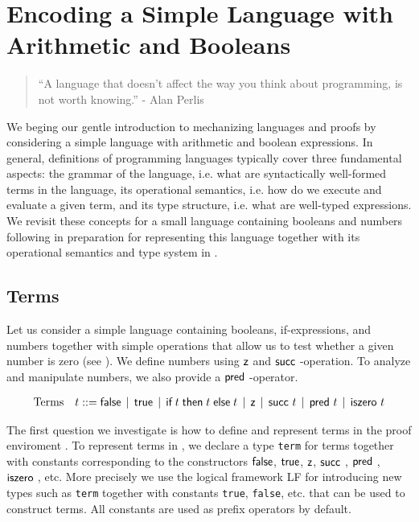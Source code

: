 

\chapter{Encoding a Simple Language with Arithmetic and Booleans}
\label{chap:basic}
\begin{quote}
``A language that doesn't affect the way you think about programming, is
not worth knowing.''
\hfill - Alan Perlis
\end{quote}

We beging our gentle introduction to mechanizing languages and proofs by
considering a simple language with arithmetic and boolean
expressions. In general, definitions of programming languages
typically cover three fundamental aspects: 
the grammar  of the language,  i.e. what are syntactically  well-formed terms in
the language,  its operational semantics,  i.e. how do we execute and evaluate a
given term,  and its  type structure, i.e. what are  well-typed expressions.  We
revisit  these concepts  for  a small language  containing booleans  and numbers
following \citep[Ch 3,Ch 8]{TAPL} in  preparation for representing this language
together with its operational semantics and type system in \beluga.

\section{Terms}\label{sec:terms-basic}
Let  us  consider  a simple language  containing booleans,  if-expressions,  and
numbers together  with simple operations  that allow us  to test whether a given
number is zero (see \cite[Ch 3, Fig 3-1,Fig 3-2]{TAPL}). We define numbers using
$\textsf{z}$ and $\tmsucc$-operation.  To analyze  and manipulate numbers,  we also
provide a $\tmpred$-operator.

\[
\begin{array}{ll@{\bnfas}l}
\mbox{Terms} & t & \tmfalse \bnfalt \tmtrue \bnfalt \tmif t t t \bnfalt
\tmzero \bnfalt \tmsucc t \bnfalt \tmpred t \bnfalt \tmiszero t
\end{array}
\]

The first question  we investigate is  how to define  and represent terms in the
proof  enviroment  \beluga. To represent  terms  in \beluga,  we declare  a type
\lstinline!term!  for  terms   together  with  constants  corresponding  to  the
constructors    $\textsf{false}$,   $\textsf{true}$,    $\textsf{z}$,   $\tmsucc$,   $\tmpred$,
$\tmiszero$,  etc.   More   precisely   we   use   the   logical   framework  LF
\citep{Harper93jacm} for introducing new types such as \lstinline!term! together
with constants  \lstinline!true!,  \lstinline!false!, etc.  that  can be used to
construct terms. All constants are used as prefix operators by default.

